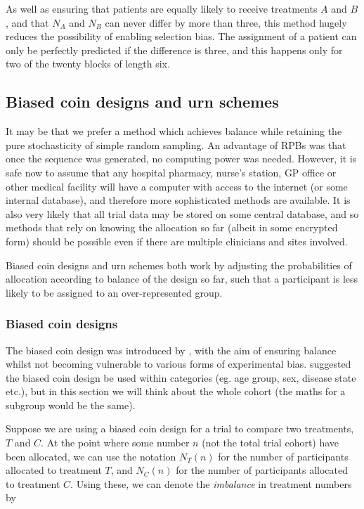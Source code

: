 \documentclass[
  openany]{book}
\theoremstyle{definition}
\theoremstyle{definition}
\theoremstyle{definition}
\theoremstyle{definition}
\theoremstyle{remark}
\begin{document}
As well as ensuring that patients are equally likely to receive treatments \(A\) and \(B\), and that \(N_A\) and \(N_B\) can never differ by more than three, this method hugely reduces the possibility of enabling selection bias. The assignment of a patient can only be perfectly predicted if the difference is three, and this happens only for two of the twenty blocks of length six.

\hypertarget{biased-coin-designs-and-urn-schemes}{%
\subsection{Biased coin designs and urn schemes}\label{biased-coin-designs-and-urn-schemes}}

It may be that we prefer a method which achieves balance while retaining the pure stochasticity of simple random sampling. An advantage of RPBs was that once the sequence was generated, no computing power was needed. However, it is safe now to assume that any hospital pharmacy, nurse's station, GP office or other medical facility will have a computer with access to the internet (or some internal database), and therefore more sophisticated methods are available. It is also very likely that all trial data may be stored on some central database, and so methods that rely on knowing the allocation so far (albeit in some encrypted form) should be possible even if there are multiple clinicians and sites involved.

Biased coin designs and urn schemes both work by adjusting the probabilities of allocation according to balance of the design so far, such that a participant is less likely to be assigned to an over-represented group.

\hypertarget{biased-coin-designs}{%
\subsubsection{Biased coin designs}\label{biased-coin-designs}}

The biased coin design was introduced by \citet{efron1971forcing}, with the aim of ensuring balance whilst not becoming vulnerable to various forms of experimental bias. \citet{efron1971forcing} suggested the biased coin design be used within categories (eg. age group, sex, disease state etc.), but in this section we will think about the whole cohort (the maths for a subgroup would be the same).

Suppose we are using a biased coin design for a trial to compare two treatments, \(T\) and \(C\). At the point where some number \(n\) (not the total trial cohort) have been allocated, we can use the notation \(N_T\left(n\right)\) for the number of participants allocated to treatment \(T\), and \(N_C\left(n\right)\) for the number of participants allocated to treatment \(C\). Using these, we can denote the \emph{imbalance} in treatment numbers by
\end{document}
